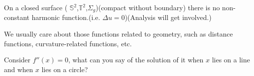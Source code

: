 \begin{exam}
    On a closed surface ( $\mathbb{S}^2$,$\mathbb{T}^2$,$\Sigma_g$)(compact without boundary) there is no non-constant harmonic function.(i.e. $\Delta u=0$)(Analysis will get involved.)
\end{exam}
We usually care about those functions related to geometry, such as distance functions, curvature-related functions, etc.
\begin{exam}
    Consider $f''(x)=0$, what can you say of the solution of it when $x$ lies on a line and when $x$ lies on a circle?
\end{exam}
